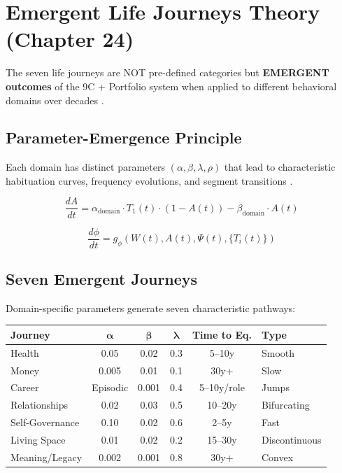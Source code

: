 \section{Emergent Life Journeys Theory (Chapter 24)}
\label{sec:mp-life-journeys}

The seven life journeys are NOT pre-defined categories but \textbf{EMERGENT outcomes}
of the 9C + Portfolio system when applied to different behavioral domains over decades \citep{elder1998children, bengtson2001families, hofstede2001cultures}.

\subsection{Parameter-Emergence Principle}

Each domain has distinct parameters $(\alpha, \beta, \lambda, \rho)$ that lead to
characteristic habituation curves, frequency evolutions, and segment transitions \citep{heckman2006skill, cunha2007technology}.

\begin{equation}
\boxed{
\frac{dA}{dt} = \alpha_{\text{domain}} \cdot T_1(t) \cdot (1 - A(t)) - \beta_{\text{domain}} \cdot A(t)
}
\end{equation}

\begin{equation}
\boxed{
\frac{d\phi}{dt} = g_\phi(W(t), A(t), \Psi(t), \{T_i(t)\})
}
\end{equation}

\subsection{Seven Emergent Journeys}

Domain-specific parameters generate seven characteristic pathways:

\begin{center}
\small
\begin{tabular}{@{}lccccl@{}}
\toprule
\textbf{Journey} & $\boldsymbol{\alpha}$ & $\boldsymbol{\beta}$ & $\boldsymbol{\lambda}$ & \textbf{Time to Eq.} & \textbf{Type} \\
\midrule
Health & 0.05 & 0.02 & 0.3 & 5--10y & Smooth \\
Money & 0.005 & 0.01 & 0.1 & 30y+ & Slow \\
Career & Episodic & 0.001 & 0.4 & 5--10y/role & Jumps \\
Relationships & 0.02 & 0.03 & 0.5 & 10--20y & Bifurcating \\
Self-Governance & 0.10 & 0.02 & 0.6 & 2--5y & Fast \\
Living Space & 0.01 & 0.02 & 0.2 & 15--30y & Discontinuous \\
Meaning/Legacy & 0.002 & 0.001 & 0.8 & 30y+ & Convex \\
\bottomrule
\end{tabular}
\end{center}


